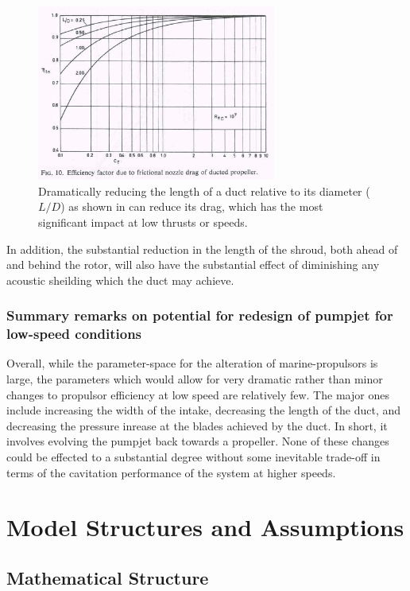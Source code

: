 \documentclass{article}\usepackage[]{graphicx}\usepackage[]{color}
\begin{document}
\begin{figure}[h]
\captionsetup{width=0.7\textwidth}
\includegraphics[width=0.7\textwidth, center]{NozzleDrag.png}
\caption{Dramatically reducing the length of a duct relative to its diameter ($L/D$) as shown in \cite{oosterveld1970} can reduce its drag, which has the most significant impact at low thrusts or speeds.}
\label{fig:NozzleDrag.png}
\end{figure}

In addition, the substantial reduction in the length of the shroud, both ahead of and behind the rotor, will also have the substantial effect of diminishing any acoustic sheilding which the duct may achieve.

\subsubsection{Summary remarks on potential for redesign of pumpjet for low-speed conditions}
Overall, while the parameter-space for the alteration of marine-propulsors is large, the parameters which would allow for very dramatic rather than minor changes to propulsor efficiency at low speed are relatively few.  The major ones include increasing the width of the intake, decreasing the length of the duct, and decreasing the pressure inrease at the blades achieved by the duct.  In short, it involves evolving the pumpjet back towards a propeller.  None of these changes could be effected to a substantial degree without some inevitable trade-off in terms of the cavitation performance of the system at higher speeds.

\newpage  \section{Model Structures and Assumptions}

\subsection{Mathematical Structure}
\end{document}
